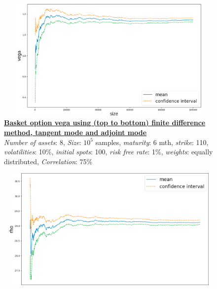 \documentclass {article}
\begin{document}
			\begin{center}
				\begin{figure}[!h]
					\centering
				            \includegraphics[width=15cm, height=6cm]{stdBasketOptionAdjointModeVega.png}
							\caption{\textbf{\underline{Basket option vega using (top to bottom) finite difference method, tangent mode and adjoint mode}} 
							\\ \textit{Number of assets}: 8, \textit{Size}: $10^{5}$ samples, \textit{maturity}: 6 mth, \textit{strike}: 110, \textit{volatilities}: 10\%, \textit{initial spots}: 100, \textit{risk free rate}: 1\%, \textit{weights}: equally distributed, \textit{Correlation}: 75\%}
				\end{figure}
			\end{center}

			\newpage

			\begin{center}
				\begin{figure}[!h]
					\centering
				            \includegraphics[width=15cm, height=6cm]{stdBasketOptionFiniteDifferenceMethodRho.png}
				\end{figure}
			\end{center}
			
\end{document}
